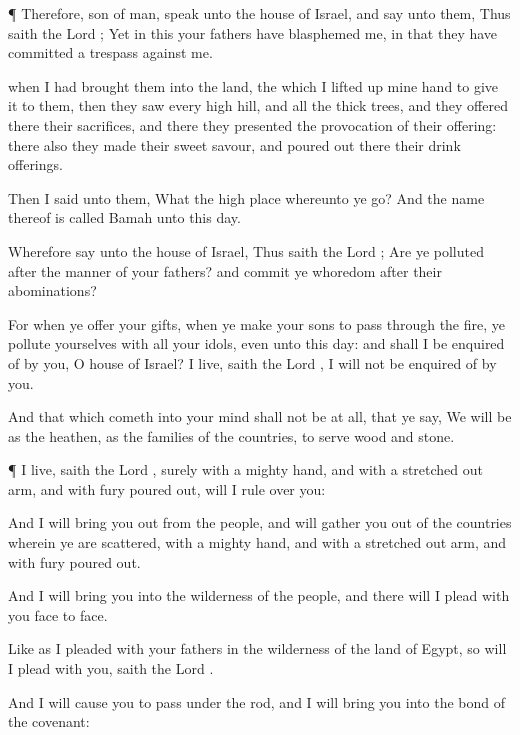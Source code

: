 {\par }{\PP {}¶ Therefore,
son of
man,
speak unto the
house of
Israel, and
say unto them, Thus
saith the
Lord
{}; Yet in this your
fathers have
blasphemed me, in that they have
committed a
trespass against me.

 when I had
brought them into the
land,
{} the which I lifted
up mine
hand to
give it to them, then they
saw every
high
hill, and all the
thick
trees, and they
offered there their
sacrifices, and there they
presented the
provocation of their
offering: there also they
made their
sweet
savour, and poured
out there their drink
offerings.

Then I
said unto them, What
{} the high
place whereunto ye
go? And the
name thereof is
called
Bamah unto this
day.

Wherefore
say unto the
house of
Israel, Thus
saith the
Lord
{}; Are ye
polluted after the
manner of your
fathers? and commit ye
whoredom
after their
abominations?

For when ye
offer your
gifts, when ye make your
sons to pass
through the
fire, ye
pollute yourselves with all your
idols, even unto this
day: and shall I be
enquired of by you, O
house of
Israel?
{} I
live,
saith the
Lord
{}, I will not be
enquired of by you.

And that which
cometh into your
mind shall not be at all, that ye
say, We will
be as the
heathen, as the
families of the
countries, to
serve
wood and
stone.


\par }{\PP {}¶
{} I
live,
saith the
Lord
{}, surely with a
mighty
hand, and with a stretched
out
arm, and with
fury poured
out, will I
rule over you:

And I will bring you
out from the
people, and will
gather you out of the
countries wherein ye are
scattered, with a
mighty
hand, and with a stretched
out
arm, and with
fury poured
out.

And I will
bring you into the
wilderness of the
people, and there will I
plead with you
face to
face.

Like as I
pleaded with your
fathers in the
wilderness of the
land of
Egypt, so will I
plead with you,
saith the
Lord
{}.

And I will cause you to
pass under the
rod, and I will
bring you into the
bond of the
covenant:

}
